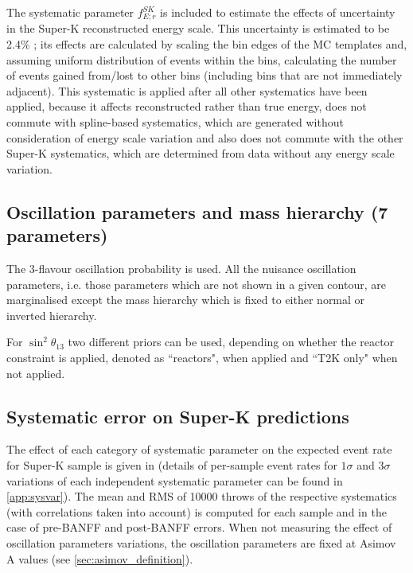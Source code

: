 The systematic parameter $f_{E; r}^{SK}$ is included to estimate the effects of uncertainty in the Super-K reconstructed energy scale.  This uncertainty is estimated to be 2.4\% \cite{SuperkEScale2013}; its effects are calculated by scaling the bin edges of the MC templates and, assuming uniform distribution of events within the bins, calculating the number of events gained from/lost to other bins (including bins that are not immediately adjacent). This systematic is applied after all other systematics have been applied, because it affects reconstructed rather than true energy, does not commute with spline-based systematics, which are generated without consideration of energy scale variation and also does not commute with the other Super-K systematics, which are determined from data without any energy scale variation.

\subsection{Oscillation parameters and mass hierarchy (7 parameters)}

The 3-flavour oscillation probability is used.  All the nuisance oscillation parameters, i.e. those parameters which are not shown in a given contour, are marginalised except the mass hierarchy which is fixed to either normal or inverted hierarchy.

For $\sin^2 \theta_{13}$ two different priors can be used, depending on whether the reactor constraint is applied, denoted as ``reactors", when applied and ``T2K only" when not applied.


\subsection{Systematic error on Super-K predictions}
\label{sec:systematics:errortables}

The effect of each category of systematic parameter on the expected event rate for Super-K sample is given in  (details of per-sample event rates for $1\sigma$ and $3\sigma$ variations of each independent systematic parameter can be found in \cref{app:sysvar}). The mean and RMS of 10000 throws of the respective systematics (with correlations taken into account) is computed for each sample and in the case of pre-BANFF and post-BANFF errors. When not measuring the effect of oscillation parameters variations, the oscillation parameters are fixed at Asimov A values (see \cref{sec:asimov_definition}).

